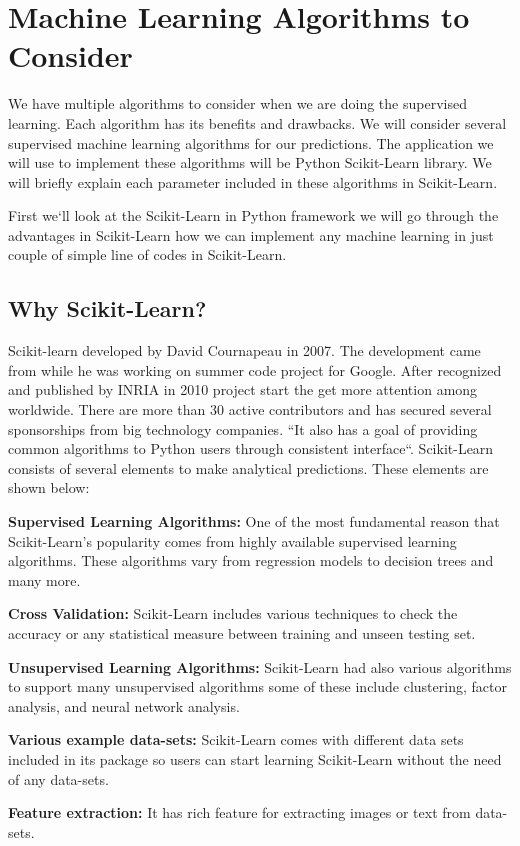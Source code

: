 \documentclass[sigconf]{acmart}
\begin{document}
 


\section{Machine Learning Algorithms to Consider}
We have multiple algorithms to consider when we are doing the supervised learning. Each algorithm has its benefits and drawbacks. We will consider several supervised machine learning algorithms for our predictions. The application we will use to implement these algorithms will be Python Scikit-Learn library. We will briefly explain each parameter included in these algorithms in Scikit-Learn.

\par First we`ll look at the Scikit-Learn in Python framework we will go through the advantages in Scikit-Learn how we can implement any machine learning in just couple of simple line of codes in Scikit-Learn. 

\subsection{Why Scikit-Learn?}
Scikit-learn developed by David Cournapeau in 2007. The development came from while he was working on summer code project for Google. After recognized and published by INRIA in 2010 project start the get more attention among worldwide. There are more than 30 active contributors and has secured several sponsorships from big technology companies\cite{www-machinelearningmystery}. ``It also has a goal of providing common algorithms to Python users through consistent interface\cite{www-oreily}``. Scikit-Learn consists of several elements to make analytical predictions. These elements are shown below\cite{www-analyticvidhya}:


\par \textbf{Supervised Learning Algorithms:} One of the most fundamental reason that Scikit-Learn's popularity comes from highly available supervised learning algorithms. These algorithms vary from regression models to decision trees and many more\cite{www-analyticvidhya}. 
\par \textbf{Cross Validation:} Scikit-Learn includes various techniqu\-es to check the accuracy or any statistical measure between training and unseen testing set\cite{www-analyticvidhya}. 
\par \textbf{Unsupervised Learning Algorithms:} Scikit-Learn had al\-so various algorithms to support many unsupervised algorithms some of these include clustering, factor analysis, and neural network analysis\cite{www-analyticvidhya}. 
\par \textbf{Various example data-sets:} Scikit-Learn comes with different data sets included in its package so users can start learning Scikit-Learn without the need of any data-sets\cite{www-analyticvidhya}. 
\par \textbf{Feature extraction:} It has rich feature for extracting images or text from data-sets\cite{www-analyticvidhya}.
\end{document}
